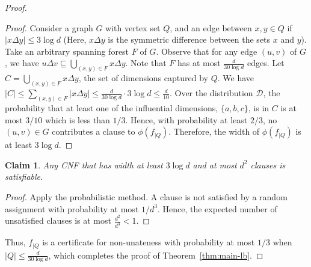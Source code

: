 \documentclass[11pt]{article}
\newtheorem{claim}[theorem]{Claim}
\newcommand{\cD}{\mathcal{D}}
\begin{document}
\begin{proof}
\begin{proof} 
Consider a graph $G$ with vertex set $Q$, and an edge between $x,y \in Q$
if $|x\Delta y| \leq 3\log d$ (Here, $x \Delta y$ is the symmetric difference between the sets $x$ and $y$). 
Take an arbitrary spanning forest $F$ of $G$.
Observe that for any edge $(u,v)$ of $G$, we have $u\Delta v \subseteq \bigcup_{(x,y) \in F} x\Delta y$.
Note that $F$ has at most $\frac{d}{30\log d}$ edges. 
Let $C = \bigcup_{(x,y) \in F} x \Delta y$, the set of dimensions captured by $Q$.
We have $|C| \leq \sum_{(x,y) \in F} |x\Delta y|
\leq \frac{d}{30 \log d} \cdot 3\log d \leq \frac{d}{10}$. 
Over the distribution $\cD$, the probability that at least one of the influential dimensions, $\{a,b,c\}$, is in $C$ is at most ${3}/{10}$ which is less than $1/3$.
Hence, with probability at least ${2}/{3}$,
no $(u,v) \in G$ contributes a clause to $\phi(f_{|Q})$. Therefore, the width
of $\phi(f_{|Q})$ is at least $3\log d$.
\end{proof} 

\begin{claim}  \label{clm:cnf-satisfiable}
Any CNF that has width at least $3\log d$ and at most $d^2$ clauses is satisfiable.
\end{claim}

\begin{proof} 
Apply the probabilistic method. A clause is not satisfied by a random assignment with
probability at most $1/d^3$.
Hence, the expected number of unsatisfied clauses is at most $\frac{d^2}{d^3} < 1$.
\end{proof}

\noindent
Thus, $f_{|Q}$ is a certificate for non-unateness with probability at most $1/3$ when $|Q| \leq \frac{d}{30 \log d}$, which completes the proof of Theorem~\ref{thm:main-lb}.
\end{proof}


\end{document}

